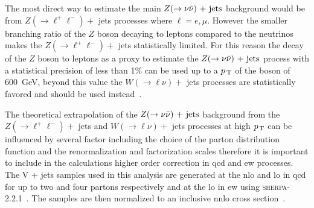 The most direct way to estimate the main $Z (\rightarrow \nu \bar{\nu})\mathrm{~+~jets}$ background would be
from $Z (\rightarrow \ell^+ \ell^-) +$ jets processes where $\ell = e, \mu$.
However the smaller branching ratio of the $Z$ boson decaying to leptons
compared to the neutrinos makes the $Z (\rightarrow \ell^+ \ell^-) +$ jets
statistically limited. For this reason the decay of the $Z$ boson to leptons as
a proxy to estimate the $Z (\rightarrow \nu \bar{\nu})\mathrm{~+~jets}$ process with a statistical precision of
less than 1\% can be used up to a $p_\mathrm{\, T}$ of the boson of 600~GeV, beyond this
value the $W(\rightarrow \ell \nu) +$ jets processes are statistically favored
and should be used instead~\cite{VplusJetsCorrections}.

The theoretical extrapolation of the $Z (\rightarrow \nu \bar{\nu})\mathrm{~+~jets}$ background from the
$Z (\rightarrow \ell^+ \ell^-) +$ jets and $W(\rightarrow \ell \nu) +$ jets
processes at high $p_\mathrm{\, T}$ can be influenced by several factor including the choice
of the parton distribution function and the renormalization and factorization
scales therefore it is important to include in the calculations higher order
correction in \gls{qcd} and \gls{ew} processes. The V + jets samples used in
this analysis are generated at the \gls{nlo} and \gls{lo} in \gls{qcd} for up to
two and four partons respectively and at the \gls{lo} in \gls{ew} using
\textsc{sherpa-2.2.1}~\cite{SHERPAGenerator}. The samples are then normalized to
an inclusive \gls{nnlo} cross section~\cite{NNLOXs}.

